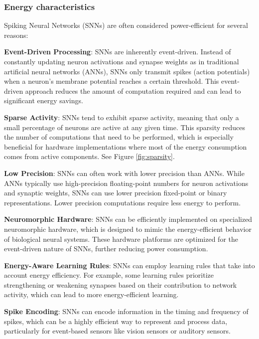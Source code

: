 \begin{frame}[allowframebreaks]
	\frametitle{Energy characteristics}
	
		\par Spiking Neural Networks (SNNs) are often considered power-efficient for several reasons:
		
		\par \textbf{Event-Driven Processing}: SNNs are inherently event-driven. Instead of constantly updating neuron activations and synapse weights as in traditional artificial neural networks (ANNs), SNNs only transmit spikes (action potentials) when a neuron's membrane potential reaches a certain threshold. This event-driven approach reduces the amount of computation required and can lead to significant energy savings.
		
		\par \textbf{Sparse Activity}: SNNs tend to exhibit sparse activity, meaning that only a small percentage of neurons are active at any given time. This sparsity reduces the number of computations that need to be performed, which is especially beneficial for hardware implementations where most of the energy consumption comes from active components. See Figure \ref{fig:sparsity}.
		
		\par \textbf{Low Precision}: SNNs can often work with lower precision than ANNs. While ANNs typically use high-precision floating-point numbers for neuron activations and synaptic weights, SNNs can use lower precision fixed-point or binary representations. Lower precision computations require less energy to perform.
		
		\par \textbf{Neuromorphic Hardware}: SNNs can be efficiently implemented on specialized neuromorphic hardware, which is designed to mimic the energy-efficient behavior of biological neural systems. These hardware platforms are optimized for the event-driven nature of SNNs, further reducing power consumption.
		
		\par \textbf{Energy-Aware Learning Rules}: SNNs can employ learning rules that take into account energy efficiency. For example, some learning rules prioritize strengthening or weakening synapses based on their contribution to network activity, which can lead to more energy-efficient learning.
		
		\par \textbf{Spike Encoding}: SNNs can encode information in the timing and frequency of spikes, which can be a highly efficient way to represent and process data, particularly for event-based sensors like vision sensors or auditory sensors.
		

\end{frame}

